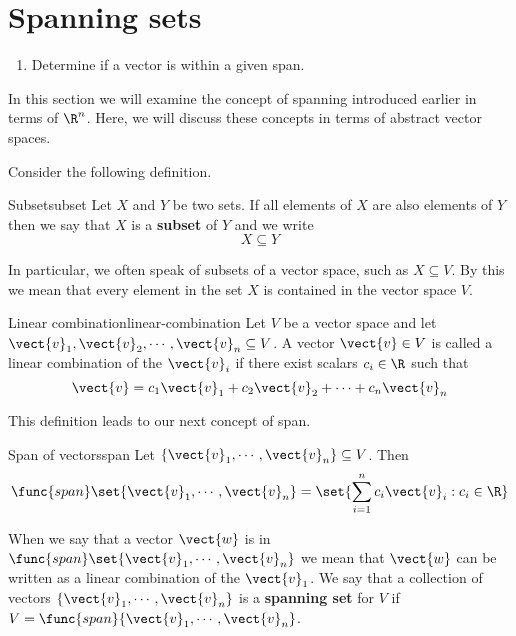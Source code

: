 \section{Spanning sets}

\begin{outcome}
  \begin{enumerate}
  \item Determine if a vector is within a given span.
  \end{enumerate}
\end{outcome}

In this section we will examine the concept of spanning introduced earlier in terms of $\R^n$. Here, we will discuss these concepts in terms of abstract vector spaces. 

Consider the following definition. 

\begin{definition}{Subset}{subset}
Let $X$ and $Y$ be two sets. If all elements of $X$ are also elements of $Y$ then we say that $X$ is a \textbf{subset} of $Y$ and we write
\[
X \subseteq Y
\]
\end{definition}

In particular, we often speak of subsets of a vector space, such as $X \subseteq V$. By this we mean that every element in the set $X$ is contained in the vector space $V$. 

\begin{definition}{Linear combination}{linear-combination}
Let $V$ be a vector space and let $\vect{v}_1, \vect{v}_2, \cdots, \vect{v}_n \subseteq V$. A vector $\vect{v} \in V$ is called a linear combination of the $\vect{v}_i$ if there exist scalars $c_i \in \R$ such that 
\[
\vect{v} = c_1 \vect{v}_1 + c_2 \vect{v}_2 + \cdots + c_n \vect{v}_n
\]
\end{definition}

This definition leads to our next concept of span.

\begin{definition}{Span of vectors}{span}
Let $\{\vect{v}_{1},\cdots ,\vect{v}_{n}\} \subseteq V$. Then
\begin{equation*}
\func{span}\set{\vect{v}_{1},\cdots ,\vect{v}_{n}} = 
\set{\sum_{i=1}^{n}c_{i}\vect{v}_{i}: c_{i}\in \R
} 
\end{equation*}
\end{definition}

When we say that a vector $\vect{w}$ is in $\func{span}\set{\vect{v}_{1},\cdots ,\vect{v}_{n}}$ we mean that $\vect{w}$ can be written as a linear combination of the $\vect{v}_1$. We say that a collection of vectors $\{\vect{v}_{1},\cdots ,\vect{v}_{n}\}$ is a \textbf{spanning set} for $V$ if $V = \func{span} \{\vect{v}_{1},\cdots ,\vect{v}_{n}\}$. 

